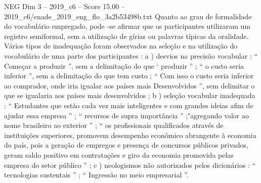 \begin{textsample}{NEG Dim 3 – 2019\_c6 – Score 15.00 – 2019\_c6/enade\_2019\_eng\_flo\_3a2b53498b.txt}
Quanto ao grau de formalidade do vocabulário empregado, pode -se afirmar que os participantes utilizaram um registro semiformal, sem a utilização de gírias ou palavras típicas da oralidade.
Vários tipos de inadequação foram observados na seleção e na utilização do vocabulário de uma parte dos participantes : a ) desvios na precisão vocabular : “ Começar a produzir ”, sem a delimitação do que ‘ produzir ” ; “ o custo seria inferior ”, sem a delimitação do que tem custo ; “ Com isso o custo seria inferior ao comprador, onde iria igualar aos países mais Desenvolvidos ”, sem delimitar o que se igualaria aos países mais desenvolvidos ; b ) seleção vocabular inadequada : “ Estudantes que estão cada vez mais inteligentes e com grandes ideias afim de ajudar essa empresa ” ; “ recursos de supra importância ” ;"agregando valor ao nome brasileiro ao exterior ” ; “ os profissionais qualificados através de instituições superiores, promovem desempenho econômico abrangente à economia do país, pois a geração de empregos e presença de concursos públicos privados, geram saldo positivo em contratações e giro da economia promovida pelas empresa do setor público ” ; c ) neologismos não autorizados pelos dicionários : “ tecnologias sustentais ” ; “ Ingressão no meio empresarial ”.

\end{textsample}
